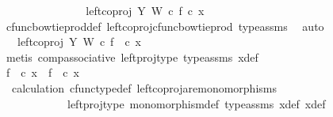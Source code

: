 \begin{isabellebody}
\ \ \ \ \ \ \ \ \ \ \isamarkupfalse%
\ \isamarkupfalse%
\ {\isachardoublequoteopen}{\isachardot}{\kern0pt}{\isachardot}{\kern0pt}{\isachardot}{\kern0pt}\ {\isacharequal}{\kern0pt}\ {\isacharparenleft}{\kern0pt}left{\isacharunderscore}{\kern0pt}coproj\ Y\ W\ {\isasymcirc}\isactrlsub c\ f{\isacharparenright}{\kern0pt}\ {\isasymcirc}\isactrlsub c\ x{}{\isachardoublequoteclose}\isanewline
\ \ \ \ \ \ \ \ \ \ \ \ \isamarkupfalse%
\ cfunc{\isacharunderscore}{\kern0pt}bowtie{\isacharunderscore}{\kern0pt}prod{\isacharunderscore}{\kern0pt}def{}\ left{\isacharunderscore}{\kern0pt}coproj{\isacharunderscore}{\kern0pt}cfunc{\isacharunderscore}{\kern0pt}bowtie{\isacharunderscore}{\kern0pt}prod\ type{\isacharunderscore}{\kern0pt}assms\ \isamarkupfalse%
\ auto\isanewline
\ \ \ \ \ \ \ \ \ \ \isamarkupfalse%
\ \isamarkupfalse%
\ {\isachardoublequoteopen}{\isachardot}{\kern0pt}{\isachardot}{\kern0pt}{\isachardot}{\kern0pt}\ {\isacharequal}{\kern0pt}\ left{\isacharunderscore}{\kern0pt}coproj\ Y\ W\ {\isasymcirc}\isactrlsub c\ f\ \ {\isasymcirc}\isactrlsub c\ x{}{\isachardoublequoteclose}\isanewline
\ \ \ \ \ \ \ \ \ \ \ \ \isamarkupfalse%
\ {\isacharparenleft}{\kern0pt}metis\ comp{\isacharunderscore}{\kern0pt}associative{}\ left{\isacharunderscore}{\kern0pt}proj{\isacharunderscore}{\kern0pt}type\ type{\isacharunderscore}{\kern0pt}assms{\isacharparenleft}{\kern0pt}{}{\isacharparenright}{\kern0pt}\ x{}{\isacharunderscore}{\kern0pt}def{\isacharparenright}{\kern0pt}\isanewline
\ \ \ \ \ \ \ \ \ \ \isamarkupfalse%
\ \isamarkupfalse%
\ {\isachardoublequoteopen}f\ \ {\isasymcirc}\isactrlsub c\ x{}\ {\isacharequal}{\kern0pt}\ f\ \ {\isasymcirc}\isactrlsub c\ x{}{\isachardoublequoteclose}\isanewline
\ \ \ \ \ \ \ \ \ \ \ \ \isamarkupfalse%
\ \ calculation\ cfunc{\isacharunderscore}{\kern0pt}type{\isacharunderscore}{\kern0pt}def\ left{\isacharunderscore}{\kern0pt}coproj{\isacharunderscore}{\kern0pt}are{\isacharunderscore}{\kern0pt}monomorphisms\isanewline
\ \ \ \ \ \ \ \ \ \ \ \ left{\isacharunderscore}{\kern0pt}proj{\isacharunderscore}{\kern0pt}type\ monomorphism{\isacharunderscore}{\kern0pt}def\ type{\isacharunderscore}{\kern0pt}assms{\isacharparenleft}{\kern0pt}{}{\isacharparenright}{\kern0pt}\ x{}{\isacharunderscore}{\kern0pt}def\ x{}{\isacharunderscore}{\kern0pt}def\ \isamarkupfalse%

\end{isabellebody}
